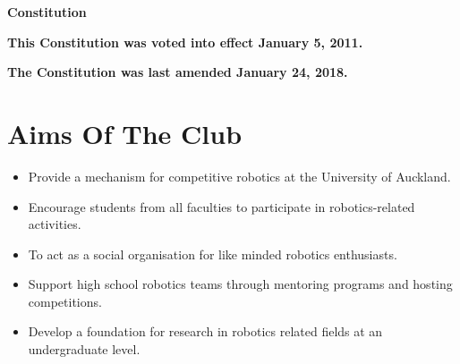 \documentclass[a4paper]{article}
\begin{document}
	\textbf{
		\underline{}
	}

	\vspace{0.1in}
	
	{
		\LARGE
		\centerline{\textbf{Constitution}}
	}

	\vspace{0.1in}
	
	\textbf{This Constitution was voted into effect January 5, 2011.}
	
	\textbf{The Constitution was last amended January 24, 2018.}
	
	\section*{Aims Of The Club}
	
	\begin{itemize}
		\item Provide a mechanism for competitive robotics at the University of Auckland.
		\item Encourage students from all faculties to participate in robotics-related activities.
		\item To act as a social organisation for like minded robotics enthusiasts.
		\item Support high school robotics teams through mentoring programs and hosting competitions.
		\item Develop a foundation for research in robotics related fields at an undergraduate level.
	\end{itemize}
	
\end{document}
